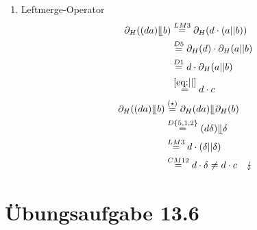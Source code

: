 \documentclass[a4paper]{scrartcl}
\begin{document}
\begin{enumerate}
    \item Leftmerge-Operator
        \begin{align}
            \begin{split}
                \partial_H ((da) \llfloor b ) &\stackrel{LM3}{=} \partial_H (d \cdot (a||b)) \\
                &\stackrel{D5}{=} \partial_H (d) \cdot \partial_H (a||b) \\
                &\stackrel{D1}{=} d \cdot \partial_H (a||b) \\
                &\stackrel{\eqref{eq:||}}{=} d \cdot c
            \end{split} \\
            \begin{split}
                \partial_H ((da) \llfloor b ) &\stackrel{(\star)}{=} \partial_H (da) \llfloor \partial_H (b) \\
                &\stackrel{D\{5,1,2\}}{=} (d\delta) \llfloor \delta \\
                &\stackrel{LM3}{=} d \cdot (\delta || \delta) \\
                &\stackrel{CM12}{=} d \cdot \delta \neq d \cdot c \quad \lightning
            \end{split}
        \end{align}

\end{enumerate}

\section*{Übungsaufgabe 13.6} 
\end{document}
